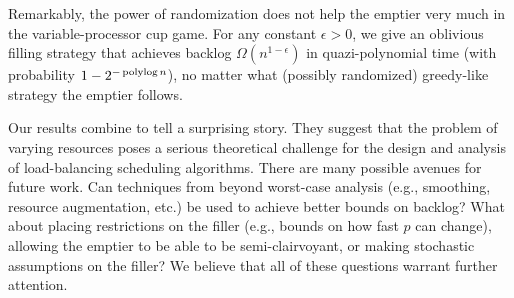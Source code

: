 Remarkably, the power of randomization does not help the emptier
very much in the variable-processor cup game. For any constant
$\epsilon > 0$, we give an oblivious filling strategy that
achieves backlog $\Omega(n^{1 - \epsilon})$ in quazi-polynomial
time (with probability $1 - 2^{-\operatorname{\text{polylog}} n}$), no matter what
(possibly randomized) greedy-like strategy the emptier follows. 

Our results combine to tell a surprising story. They suggest that
the problem of varying resources poses a serious theoretical
challenge for the design and analysis of load-balancing
scheduling algorithms. There are many possible avenues for future
work. Can techniques from beyond worst-case analysis (e.g.,
smoothing, resource augmentation, etc.) be used to achieve better
bounds on backlog? What about placing restrictions on the filler
(e.g., bounds on how fast $p$ can change), allowing the emptier
to be able to be semi-clairvoyant, or making stochastic
assumptions on the filler? We believe that all of these questions
warrant further attention.






